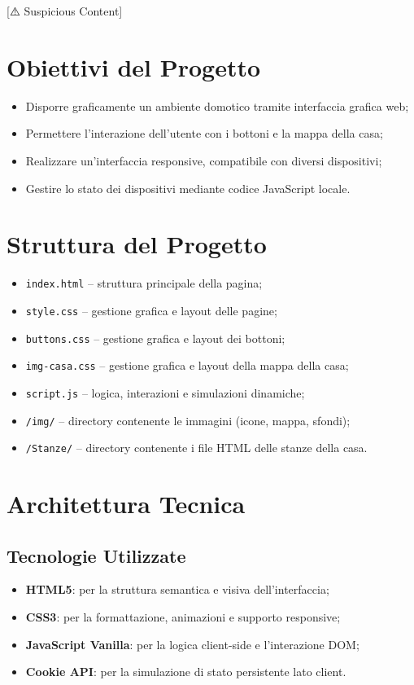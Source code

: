 [⚠️ Suspicious Content] \documentclass[a4paper,12pt]{article}
\begin{document}
\section{Obiettivi del Progetto}

\begin{itemize}
  \item Disporre graficamente un ambiente domotico tramite interfaccia grafica web;
  \item Permettere l'interazione dell'utente con i bottoni e la mappa della casa;
  \item Realizzare un’interfaccia responsive, compatibile con diversi dispositivi;
  \item Gestire lo stato dei dispositivi mediante codice JavaScript locale.
\end{itemize}

\section{Struttura del Progetto}

\begin{itemize}
  \item \texttt{index.html} – struttura principale della pagina;
  \item \texttt{style.css} – gestione grafica e layout delle pagine;
  \item \texttt{buttons.css} – gestione grafica e layout dei bottoni;
  \item \texttt{img-casa.css} – gestione grafica e layout della mappa della casa;
  \item \texttt{script.js} – logica, interazioni e simulazioni dinamiche;
  \item \texttt{/img/} – directory contenente le immagini (icone, mappa, sfondi);
  \item \texttt{/Stanze/} – directory contenente i file HTML delle stanze della casa.
\end{itemize}

\section{Architettura Tecnica}

\subsection{Tecnologie Utilizzate}

\begin{itemize}
  \item \textbf{HTML5}: per la struttura semantica e visiva dell’interfaccia;
  \item \textbf{CSS3}: per la formattazione, animazioni e supporto responsive;
  \item \textbf{JavaScript Vanilla}: per la logica client-side e l’interazione DOM;
  \item \textbf{Cookie API}: per la simulazione di stato persistente lato client.
\end{itemize}
\end{document}

